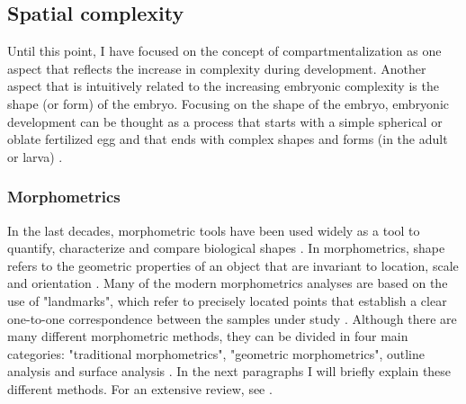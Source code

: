 %

\subsection{Spatial complexity}

Until this point, I have focused on the concept of compartmentalization 
as one aspect that reflects the increase in complexity during development.
Another aspect that is intuitively related to the increasing embryonic complexity is the shape (or form) of the embryo. Focusing on the shape of the embryo, embryonic development can be thought as a process that starts with a simple spherical or oblate fertilized egg and that ends with complex shapes and forms (in the adult or larva) \citep{Forgacs_Newman2005}.

\subsubsection{Morphometrics}

In the last decades, morphometric tools have been used widely as a tool to quantify, characterize and compare biological shapes \citep{JamesRohlf1993}. In morphometrics, shape refers to the geometric properties of an object that are invariant to location, scale and orientation \citep{Slice2005}. Many of the modern morphometrics analyses are based on the use of "landmarks", which refer to precisely located points that establish a clear one-to-one correspondence between the samples under study \citep{Klingenberg2010}. Although there are many different morphometric methods, they can be divided in four main categories: "traditional morphometrics", "geometric morphometrics", outline analysis and surface analysis \citep{Slice2005}. In the next paragraphs I will briefly explain these different methods. For an extensive review, see \citep{Bookstein1997,Dryden1998,Zelditch2008,Slice2005}.

